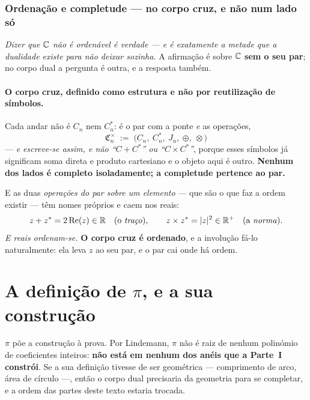 \documentclass[livro.tex]{subfiles}
\begin{document}
\subsubsection*{Ordenação e completude --- no corpo cruz, e não num lado só}

\emph{Dizer que $\mathbb C$ não é ordenável é verdade --- e é exatamente a metade que a dualidade existe
para não deixar sozinha.} A afirmação é sobre $\mathbb C$ \textbf{sem o seu par}; no corpo dual a pergunta
é outra, e a resposta também.

\paragraph{O corpo cruz, definido como estrutura e não por reutilização de símbolos.} Cada andar
não é $C_n$ nem $C_n^{*}$: é o par com a ponte \emph{e} as operações,
\[
  \boxed{\ \mathfrak C_n^{\times} \;:=\; \bigl(C_n,\ C_n^{*},\ J_n,\ \oplus,\ \otimes\bigr)\ }
\]
--- \emph{e escreve-se assim, e não ``$C+C^{*}$'' ou ``$C\times C^{*}$''}, porque esses símbolos já
significam soma direta e produto cartesiano e o objeto aqui é outro. \textbf{Nenhum dos lados é
completo isoladamente; a completude pertence ao par.}

\noindent E as duas \emph{operações do par sobre um elemento} --- que são o que faz a ordem existir
--- têm nomes próprios e caem nos reais:
\[
  z + z^{*} = 2\operatorname{Re}(z) \in\mathbb R \quad(\text{o \emph{traço}}),
  \qquad
  z \times z^{*} = |z|^{2} \in\mathbb R^{+} \quad(\text{a \emph{norma}}) .
\]
\emph{E reais ordenam-se.} \textbf{O corpo cruz é ordenado}, e a involução fá-lo naturalmente: ela
leva $z$ ao seu par, e o par cai onde há ordem.









\section{A definição de $\pi$, e a sua construção}\label{sec:pi}

\noindent $\pi$ põe a construção à prova. Por Lindemann, $\pi$ não é raiz de nenhum polinómio de coeficientes inteiros: \textbf{não
está em nenhum dos anéis que a Parte~I constrói}. Se a sua definição tivesse de ser geométrica ---
comprimento de arco, área de círculo ---, então o corpo dual precisaria da geometria para se
completar, e a ordem das partes deste texto estaria trocada.
\end{document}
